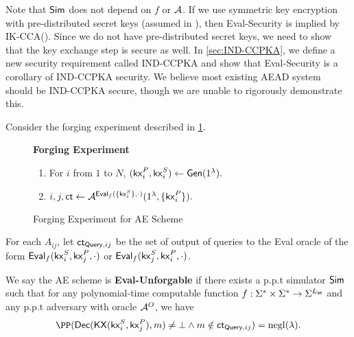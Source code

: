 Note that $\mathsf{Sim}$ does not depend on $f$ or $\mathcal{A}$. If we use symmetric key encryption with pre-distributed secret keys (assumed in \cite{angel2016unobservable}), then Eval-Security is implied by IK-CCA(\cite[Definition 1]{BBDP01keyprivate}). Since we do not have pre-distributed secret keys, we need to show that the key exchange step is secure as well. In \cref{sec:IND-CCPKA}, we define a new security requirement called IND-CCPKA  and show that Eval-Security is a corollary of IND-CCPKA security. We believe most existing AEAD system should be IND-CCPKA secure, though we are unable to rigorously demonstrate this.

\begin{definition}
\label{defn:AE-unforgability}
Consider the forging experiment described in \cref{expr:AE-forging}.

\begin{figure}[h!]
\begin{framed}
\textbf{Forging Experiment}
\begin{enumerate}
    \item For $i$ from $1$ to $N$, $(\mathsf{kx}_i^P, \mathsf{kx}_i^S) \leftarrow \mathsf{Gen}(1^{\lambda}).$
    \item $i, j, \mathsf{ct} \leftarrow \mathcal{A}^{\mathsf{Eval}_f(\{\mathsf{kx}_i^S\}, \cdot)}(1^{\lambda}, \{\mathsf{kx}_i^P\}).$
\end{enumerate}
\end{framed}
\caption{Forging Experiment for AE Scheme}
\label{expr:AE-forging}
\end{figure}

For each $A_{ij}$, let $\mathsf{ct}_{\mathsf{Query}, ij}$ be the set of output of queries to the Eval oracle of the form $\mathsf{Eval}_f(\mathsf{kx}_i^S, \mathsf{kx}_j^P, \cdot)$ or $\mathsf{Eval}_f(\mathsf{kx}_j^S, \mathsf{kx}_i^P, \cdot)$.

We say the AE scheme is \textbf{Eval-Unforgable} if there exists a p.p.t simulator $\mathsf{Sim}$ such that for any polynomial-time computable function $f: \Sigma^* \times \Sigma^* \to \Sigma^{L_{\mathsf{ae}}}$ and any p.p.t adversary with oracle $\mathcal{A}^O$, we have
$$\PP(\dec(\KX(\kx_i^S, \kx_j^P), m) \neq \bot \land m \notin \ct_{\query, ij}) = \negl(\lambda).$$
\end{definition}

